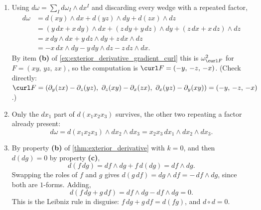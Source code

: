 \begin{exercisesolution}
\label{sol:ai_exterior_derivative_drill}
\begin{enumerate}[label=\textbf{(\alph*)}]
  \item Using $d\omega = \sum_I d\omega_I\wedge dx^I$ and discarding every wedge with a
    repeated factor,
    \begin{align*}
    d\omega &= d(xy)\wedge dx + d(yz)\wedge dy + d(zx)\wedge dz \\
      &= (y\,dx + x\,dy)\wedge dx + (z\,dy + y\,dz)\wedge dy + (z\,dx + x\,dz)\wedge dz \\
      &= x\,dy\wedge dx + y\,dz\wedge dy + z\,dx\wedge dz \\
      &= -x\,dx\wedge dy - y\,dy\wedge dz - z\,dz\wedge dx.
    \end{align*}
    By item \textbf{(b)} of \cref{ex:exterior_derivative_gradient_curl} this is
    $\omega^2_{\curl F}$ for $F = (xy,\,yz,\,zx)$, so the computation is
    $\curl F = (-y,\,-z,\,-x)$. (Check directly:
    $\curl F = (\partial_y(zx) - \partial_z(yz),\ \partial_z(xy) - \partial_x(zx),\
    \partial_x(yz) - \partial_y(xy)) = (-y,\,-z,\,-x)$.)
  \item Only the $dx_1$ part of $d(x_1x_2x_3)$ survives, the other two repeating a factor
    already present:
    \[d\omega = d(x_1x_2x_3)\wedge dx_2\wedge dx_3 = x_2x_3\,dx_1\wedge dx_2\wedge dx_3.\]
  \item By property \textbf{(b)} of \cref{thm:exterior_derivative} with $k = 0$, and then
    $d(dg) = 0$ by property \textbf{(c)},
    \[d(f\,dg) = df\wedge dg + f\,d(dg) = df\wedge dg.\]
    Swapping the roles of $f$ and $g$ gives $d(g\,df) = dg\wedge df = -\,df\wedge dg$, since both
    are $1$-forms. Adding,
    \[d(f\,dg + g\,df) = df\wedge dg - df\wedge dg = 0.\]
    This is the Leibniz rule in disguise: $f\,dg + g\,df = d(fg)$, and $d\circ d = 0$.
\end{enumerate}
\end{exercisesolution}

